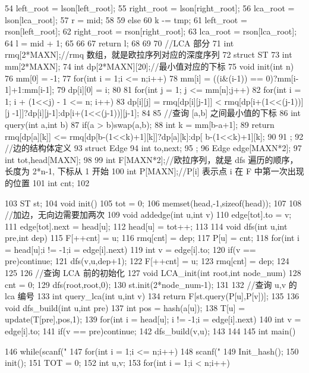 \documentclass[11pt]{article}
\begin{document}
\begin{Code}
{{{54                  left_root = lson[left_root];
55                  right_root = lson[right_root];
56                  lca_root = lson[lca_root];
57                  r = mid;
58              }
59              else{
60                  k -= tmp;
61                  left_root = rson[left_root];
62                  right_root = rson[right_root];
63                  lca_root = rson[lca_root];
64                  l = mid + 1;
65              }
66       }
67       return l;
68   }
69
70   //LCA 部分
71   int rmq[2*MAXN];//rmq 数组，就是欧拉序列对应的深度序列
72   struct ST{
73       int mm[2*MAXN];
74       int dp[2*MAXN][20];//最小值对应的下标
75       void init(int n){
76           mm[0] = -1;
77           for(int i = 1;i <= n;i++){
78                mm[i] = ((i&(i-1)) == 0)?mm[i-1]+1:mm[i-1];
79                dp[i][0] = i;
80           }
81           for(int j = 1; j <= mm[n];j++)
82                for(int i = 1; i + (1<<j) - 1 <= n; i++)
83                    dp[i][j] = rmq[dp[i][j-1]] < rmq[dp[i+(1<<(j-1))][j
                         -1]]?dp[i][j-1]:dp[i+(1<<(j-1))][j-1];
84       }
85       //查询 [a,b] 之间最小值的下标
86       int query(int a,int b){
87           if(a > b)swap(a,b);
88           int k = mm[b-a+1];
89           return rmq[dp[a][k]] <= rmq[dp[b-(1<<k)+1][k]]?dp[a][k]:dp[
                b-(1<<k)+1][k];
 90      }
 91  };
 92  //边的结构体定义
 93  struct Edge{
 94      int to,next;
 95  };
 96  Edge edge[MAXN*2];
 97  int tot,head[MAXN];
 98
 99 int F[MAXN*2];//欧拉序列，就是 dfs 遍历的顺序，长度为 2*n-1, 下标从 1 开始
100 int P[MAXN];//P[i] 表示点 i 在 F 中第一次出现的位置
101 int cnt;
102


103   ST st;
104   void init(){
105       tot = 0;
106       memset(head,-1,sizeof(head));
107   }
108   //加边，无向边需要加两次
109   void addedge(int u,int v){
110       edge[tot].to = v;
111       edge[tot].next = head[u];
112       head[u] = tot++;
113   }
114   void dfs(int u,int pre,int dep){
115       F[++cnt] = u;
116       rmq[cnt] = dep;
117       P[u] = cnt;
118       for(int i = head[u];i != -1;i = edge[i].next){
119           int v = edge[i].to;
120           if(v == pre)continue;
121           dfs(v,u,dep+1);
122           F[++cnt] = u;
123           rmq[cnt] = dep;
124       }
125   }
126   //查询 LCA 前的初始化
127   void LCA_init(int root,int node_num){
128       cnt = 0;
129       dfs(root,root,0);
130       st.init(2*node_num-1);
131   }
132   //查询 u,v 的 lca 编号
133   int query_lca(int u,int v){
134       return F[st.query(P[u],P[v])];
135   }
136   void dfs_build(int u,int pre){
137       int pos = hash(a[u]);
138       T[u] = update(T[pre],pos,1);
139       for(int i = head[u]; i != -1;i = edge[i].next){
140           int v = edge[i].to;
141           if(v == pre)continue;
142           dfs_build(v,u);
143       }
144   }
145   int main(){
146       while(scanf("%
147           for(int i = 1;i <= n;i++)
148                scanf("%
149           Init_hash();
150           init();
151           TOT = 0;
152           int u,v;
153           for(int i = 1;i < n;i++){


}}
\end{Code}
\end{document}
